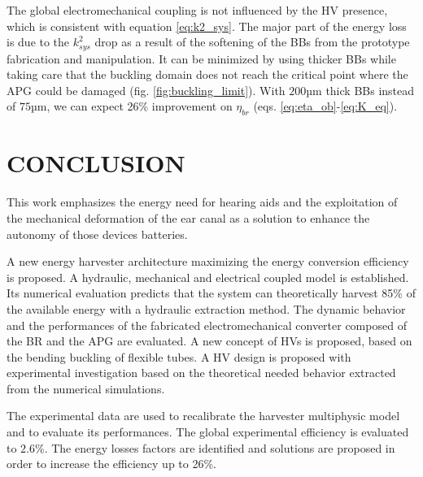\documentclass[3p,twocolumn,preprint]{elsarticle}
\begin{document}
The global electromechanical coupling is not influenced by the HV presence, which is consistent with equation \ref{eq:k2_sys}. The major part of the energy loss is due to the $k^2_{sys}$ drop as a result of the softening of the BBs from the prototype fabrication and manipulation. It can be minimized by using thicker BBs while taking care that the buckling domain does not reach the critical point where the APG could be damaged (fig. \ref{fig:buckling_limit}). With $200$µm thick BBs instead of $75$µm, we can expect 26\% improvement on $\eta_{br}$ (eqs. \ref{eq:eta_ob}-\ref{eq:K_eq}).
\section{CONCLUSION}
\label{sec:CONCLUSION}
This work emphasizes the energy need for hearing aids and the exploitation of the mechanical deformation of the ear canal as a solution to enhance the autonomy of those devices batteries.

A new energy harvester architecture maximizing the energy conversion efficiency is proposed. A hydraulic, mechanical and electrical coupled model is established. Its numerical evaluation predicts that the system can theoretically harvest 85\% of the available energy with a hydraulic extraction method. The dynamic behavior and the performances of the fabricated electromechanical converter composed of the BR and the APG are evaluated. A new concept of HVs is proposed, based on the bending buckling of flexible tubes. A HV design is proposed with experimental investigation based on the theoretical needed behavior extracted from the numerical simulations.

The experimental data are used to recalibrate the harvester multiphysic model and to evaluate its performances. The global experimental efficiency is evaluated to $2.6$\%. The energy losses factors are identified and solutions are proposed in order to increase the efficiency up to 26\%.







% 
\end{document}
